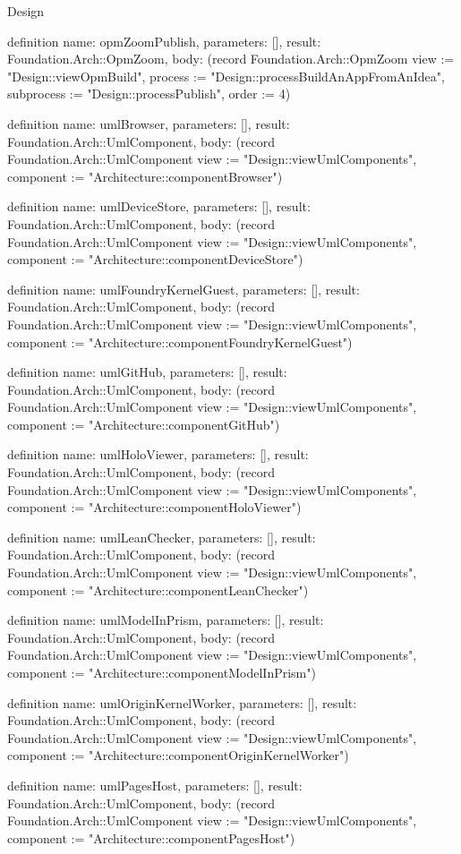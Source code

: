 \begin{lexlean}{Design}
\begin{semanticmodule}
definition{
  name: opmZoomPublish,
  parameters: [],
  result: Foundation.Arch::OpmZoom,
  body: (record Foundation.Arch::OpmZoom {view := "Design::viewOpmBuild", process := "Design::processBuildAnAppFromAnIdea", subprocess := "Design::processPublish", order := 4})
}

definition{
  name: umlBrowser,
  parameters: [],
  result: Foundation.Arch::UmlComponent,
  body: (record Foundation.Arch::UmlComponent {view := "Design::viewUmlComponents", component := "Architecture::componentBrowser"})
}

definition{
  name: umlDeviceStore,
  parameters: [],
  result: Foundation.Arch::UmlComponent,
  body: (record Foundation.Arch::UmlComponent {view := "Design::viewUmlComponents", component := "Architecture::componentDeviceStore"})
}

definition{
  name: umlFoundryKernelGuest,
  parameters: [],
  result: Foundation.Arch::UmlComponent,
  body: (record Foundation.Arch::UmlComponent {view := "Design::viewUmlComponents", component := "Architecture::componentFoundryKernelGuest"})
}

definition{
  name: umlGitHub,
  parameters: [],
  result: Foundation.Arch::UmlComponent,
  body: (record Foundation.Arch::UmlComponent {view := "Design::viewUmlComponents", component := "Architecture::componentGitHub"})
}

definition{
  name: umlHoloViewer,
  parameters: [],
  result: Foundation.Arch::UmlComponent,
  body: (record Foundation.Arch::UmlComponent {view := "Design::viewUmlComponents", component := "Architecture::componentHoloViewer"})
}

definition{
  name: umlLeanChecker,
  parameters: [],
  result: Foundation.Arch::UmlComponent,
  body: (record Foundation.Arch::UmlComponent {view := "Design::viewUmlComponents", component := "Architecture::componentLeanChecker"})
}

definition{
  name: umlModelInPrism,
  parameters: [],
  result: Foundation.Arch::UmlComponent,
  body: (record Foundation.Arch::UmlComponent {view := "Design::viewUmlComponents", component := "Architecture::componentModelInPrism"})
}

definition{
  name: umlOriginKernelWorker,
  parameters: [],
  result: Foundation.Arch::UmlComponent,
  body: (record Foundation.Arch::UmlComponent {view := "Design::viewUmlComponents", component := "Architecture::componentOriginKernelWorker"})
}

definition{
  name: umlPagesHost,
  parameters: [],
  result: Foundation.Arch::UmlComponent,
  body: (record Foundation.Arch::UmlComponent {view := "Design::viewUmlComponents", component := "Architecture::componentPagesHost"})
}


\end{semanticmodule}
\end{lexlean}
